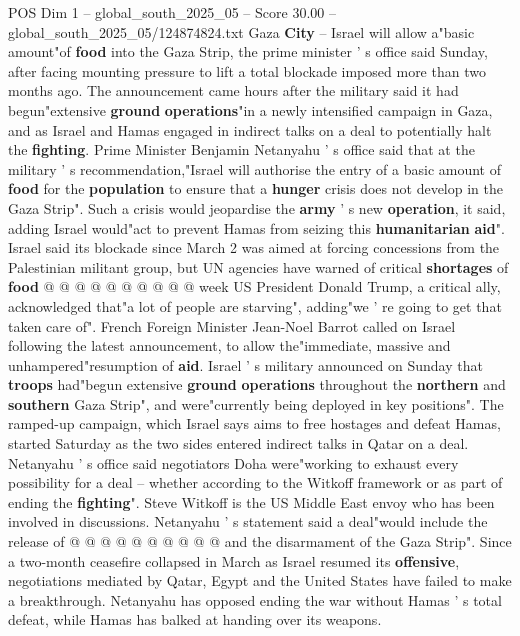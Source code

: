 \begin{textsample}{POS Dim 1 – global\_south\_2025\_05 – Score 30.00 – global\_south\_2025\_05/124874824.txt}  \label{ex:f1_pos_069}
Gaza \textbf{City} -- Israel will allow a"basic amount"of \textbf{food} into the Gaza Strip, the prime minister ' s office said Sunday, after facing mounting pressure to lift a total blockade imposed more than two months ago.
The announcement came hours after the military said it had begun"extensive \textbf{ground} \textbf{operations}"in a newly intensified campaign in Gaza, and as Israel and Hamas engaged in indirect talks on a deal to potentially halt the \textbf{fighting}.
Prime Minister Benjamin Netanyahu ' s office said that at the military ' s recommendation,"Israel will authorise the entry of a basic amount of \textbf{food} for the \textbf{population} to ensure that a \textbf{hunger} crisis does not develop in the Gaza Strip".
Such a crisis would jeopardise the \textbf{army} ' s new \textbf{operation}, it said, adding Israel would"act to prevent Hamas from seizing this \textbf{humanitarian} \textbf{aid}".
Israel said its blockade since March 2 was aimed at forcing concessions from the Palestinian militant group, but UN agencies have warned of critical \textbf{shortages} of \textbf{food} @ @ @ @ @ @ @ @ @ @ week US President Donald Trump, a critical ally, acknowledged that"a lot of people are starving", adding"we ' re going to get that taken care of".
French Foreign Minister Jean-Noel Barrot called on Israel following the latest announcement, to allow the"immediate, massive and unhampered"resumption of \textbf{aid}.
Israel ' s military announced on Sunday that \textbf{troops} had"begun extensive \textbf{ground} \textbf{operations} throughout the \textbf{northern} and \textbf{southern} Gaza Strip", and were"currently being deployed in key positions".
The ramped-up campaign, which Israel says aims to free hostages and defeat Hamas, started Saturday as the two sides entered indirect talks in Qatar on a deal.
Netanyahu ' s office said negotiators Doha were"working to exhaust every possibility for a deal -- whether according to the Witkoff framework or as part of ending the \textbf{fighting}".
Steve Witkoff is the US Middle East envoy who has been involved in discussions.
Netanyahu ' s statement said a deal"would include the release of @ @ @ @ @ @ @ @ @ @ and the disarmament of the Gaza Strip".
Since a two-month ceasefire collapsed in March as Israel resumed its \textbf{offensive}, negotiations mediated by Qatar, Egypt and the United States have failed to make a breakthrough.
Netanyahu has opposed ending the war without Hamas ' s total defeat, while Hamas has balked at handing over its weapons.

\end{textsample}
